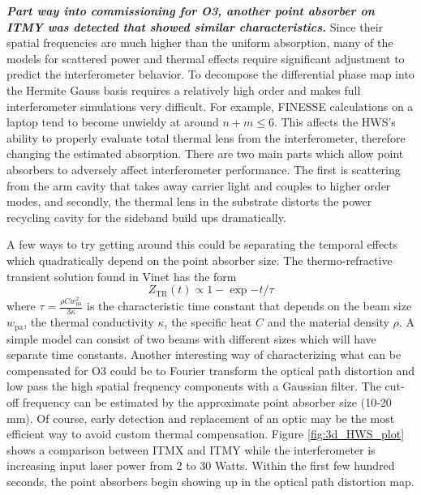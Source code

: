 	\textbf{\emph{Part way into commissioning for O3, another point absorber on ITMY was detected that showed similar characteristics.}}  Since their spatial frequencies are much higher than the uniform absorption, many of the models for scattered power and thermal effects require significant adjustment to predict the interferometer behavior.  To decompose the differential phase map into the Hermite Gauss basis requires a relatively high order and makes full interferometer simulations very difficult.  For example, FINESSE calculations on a laptop tend to become unwieldy at around $n+m \leq 6$.  This affects the HWS's ability to properly evaluate total thermal lens from the interferometer, therefore changing the estimated absorption.  There are two main parts which allow point absorbers to adversely affect interferometer performance.   The first is scattering from the arm cavity that takes away carrier light and couples to higher order modes, and secondly, the thermal lens in the substrate distorts the power recycling cavity for the sideband build ups dramatically.
	
	A few ways to try getting around this could be separating the temporal effects which quadratically depend on the point absorber size. The thermo-refractive transient solution found in Vinet \cite{Vinet_Thermal_Issues} has the form
	\begin{equation}\label{Thermal_Dist_time}
	Z_{\text{TR}}(t)   \propto 1-\exp{-t/ \tau}
	\end{equation}
	where $\tau = \frac{\rho C w_\text{pa}^2}{3 \kappa} $ is the characteristic time constant that depends on the beam size $w_\text{pa}$, the thermal conductivity $\kappa$, the specific heat $C$ and the material density $\rho$.  A simple model can consist of two beams with different sizes which will have separate time constants.  Another interesting way of characterizing what can be compensated for O3 could be to Fourier transform the optical path distortion and low pass the high spatial frequency components with a Gaussian filter. The cut-off frequency can be estimated by the approximate point absorber size (10-20 mm).  Of course, early detection and replacement of an optic may be the most efficient way to avoid custom thermal compensation.  Figure \ref{fig:3d_HWS_plot} shows a comparison between ITMX and ITMY while the interferometer is increasing input laser power from 2 to 30 Watts.  Within the first few hundred seconds, the point absorbers begin showing up in the optical path distortion map.
	
